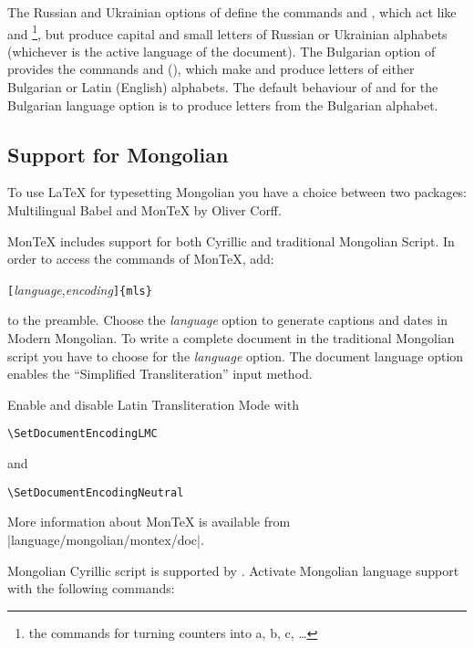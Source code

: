 The Russian and Ukrainian options of  define the commands 
and , which act like  and \footnote{the commands for turning counters into a, b, c, \ldots}, but produce capital
and small letters of Russian or Ukrainian alphabets (whichever is the
active language of the document). The Bulgarian option of  
provides the commands  and  (), which
make  and  produce letters of either
Bulgarian or Latin (English) alphabets. The default behaviour of
  and  for the Bulgarian language option is to
produce letters from the Bulgarian alphabet. 


\subsection{Support for Mongolian}

To use \LaTeX{} for typesetting Mongolian you have a choice between two packages:
Multilingual Babel and Mon\TeX{} by Oliver Corff.

Mon\TeX{} includes support for both Cyrillic and traditional
Mongolian Script. In order to access the commands of Mon\TeX{}, add:
\begin{lscommand}
\verb|[|\emph{language},\emph{encoding}\verb|]{mls}|
\end{lscommand}
\noindent to the preamble. Choose the \emph{language} option  to generate
captions and dates in Modern Mongolian. To write a complete document in the traditional Mongolian script
you have to choose  for the \emph{language} option. The document
language option  enables the ``Simplified Transliteration'' input method.

Enable and disable Latin Transliteration Mode with
\begin{lscommand}
\verb|\SetDocumentEncodingLMC|
\end{lscommand}
and
\begin{lscommand}
\verb|\SetDocumentEncodingNeutral|
\end{lscommand}

More information about Mon\TeX{} is available from
\CTAN|language/mongolian/montex/doc|.

Mongolian Cyrillic script is supported by . Activate
Mongolian language support with the following commands:

